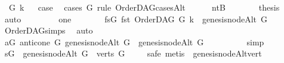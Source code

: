\begin{isabellebody}
\isamarkupfalse%
\ {\isacharparenleft}{\kern0pt}{}\ G\ k{\isacharparenright}{\kern0pt}\isanewline
{}\isamarkupfalse%
\ \isamarkupfalse%
\ {\isacharquery}{\kern0pt}case\ \isamarkupfalse%
\ {\isacharparenleft}{\kern0pt}cases\ G\ rule{\isacharcolon}{\kern0pt}\ OrderDAG{\isacharunderscore}{\kern0pt}casesAlt{\isacharparenright}{\kern0pt}\isanewline
\ \ \ \ \isamarkupfalse%
\ ntB\isanewline
\ \ \ \ \isamarkupfalse%
\ \isamarkupfalse%
\ {\isacharquery}{\kern0pt}thesis\ \isamarkupfalse%
\ {}\ \isamarkupfalse%
\ auto\isanewline
\ \ \isamarkupfalse%
\isanewline
\ \ \ \ \isamarkupfalse%
\ one\isanewline
\ \ \ \ \isamarkupfalse%
\ \isamarkupfalse%
\ fsG{\isacharcolon}{\kern0pt}\ {\isachardoublequoteopen}{\isacharparenleft}{\kern0pt}fst\ {\isacharparenleft}{\kern0pt}OrderDAG\ G\ k{\isacharparenright}{\kern0pt}{\isacharparenright}{\kern0pt}\ {\isacharequal}{\kern0pt}\ {\isacharbraceleft}{\kern0pt}genesis{\isacharunderscore}{\kern0pt}nodeAlt\ G{\isacharbraceright}{\kern0pt}{\isachardoublequoteclose}\ \isamarkupfalse%
\ OrderDAG{\isachardot}{\kern0pt}simps\ \isamarkupfalse%
\ auto\isanewline
\ \ \ \ \isamarkupfalse%
\ aG{\isacharcolon}{\kern0pt}\ {\isachardoublequoteopen}{\isacharparenleft}{\kern0pt}anticone\ G\ {\isacharparenleft}{\kern0pt}genesis{\isacharunderscore}{\kern0pt}nodeAlt\ G{\isacharparenright}{\kern0pt}{\isacharparenright}{\kern0pt}\ {\isasyminter}\ {\isacharbraceleft}{\kern0pt}genesis{\isacharunderscore}{\kern0pt}nodeAlt\ G{\isacharbraceright}{\kern0pt}\ {\isacharequal}{\kern0pt}\ {\isacharbraceleft}{\kern0pt}{\isacharbraceright}{\kern0pt}{\isachardoublequoteclose}\isanewline
\ \ \ \ \ \ \isamarkupfalse%
\ simp\isanewline
\ \ \ \ \isamarkupfalse%
\ sG{\isacharcolon}{\kern0pt}\ {\isachardoublequoteopen}\ {\isacharbraceleft}{\kern0pt}genesis{\isacharunderscore}{\kern0pt}nodeAlt\ G{\isacharbraceright}{\kern0pt}\ {\isasymsubseteq}\ verts\ G{\isachardoublequoteclose}\isanewline
\ \ \ \ \isamarkupfalse%
{\isacharparenleft}{\kern0pt}safe{\isacharcomma}{\kern0pt}\ metis\ {}{\isacharparenleft}{\kern0pt}{}{\isacharparenright}{\kern0pt}\ genesis{\isacharunderscore}{\kern0pt}nodeAlt{\isacharunderscore}{\kern0pt}vert{\isacharparenright}{\kern0pt}\ \isamarkupfalse%
\isanewline
\ \ \ \ \isamarkupfalse%

\end{isabellebody}
